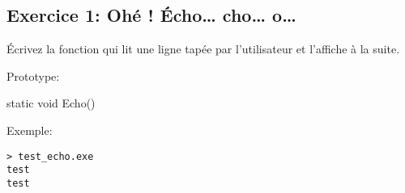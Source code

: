 \subsection{Exercice 1: Ohé ! Écho\ldots{} cho\dots{} o\dots}

Écrivez la fonction  qui lit une ligne tapée par l'utilisateur et l'affiche
à la suite.

Prototype:
\begin{code}
static void Echo()
\end{code}

Exemple:
\begin{verbatim}
> test_echo.exe
test
test
\end{verbatim}
